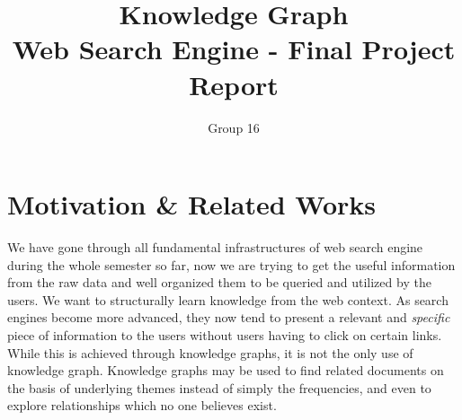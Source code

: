 \documentclass[11pt,twocolumn]{article}
\begin{document}
\baselineskip 16pt
 \newcommand{\la}{\lambda}
 \newcommand{\si}{\sigma}
 \newcommand{\ol}{1-\lambda}
 \newcommand{\be}{\begin{equation}}
 \newcommand{\ee}{\end{equation}}
 \newcommand{\bea}{\begin{eqnarray}}
 \newcommand{\eea}{\end{eqnarray}}

\setlength{\columnsep}{0.8cm}

 \newcommand{\secHead}[1]{{\bf \underline{#1}}\\}

 \newcommand{\mySection}[2]{

\begin{tabular}{l l}
\begin{minipage}[t]{1in}
\sc{#1 }
\end{minipage}

\begin{minipage}[t]{5in}
#2\\
\end{minipage}
\end{tabular}\\\\
}
\singlespacing


\title{Knowledge Graph \\ Web Search Engine - Final Project Report}
\author{Group 16}
\maketitle


\section{Motivation \& Related Works}
We have gone through all fundamental infrastructures of web search engine during the whole semester so far, now we are trying to get the useful information from the raw data and well organized them to be queried and utilized by the users. We want to structurally learn knowledge from the web context. As search engines become more advanced, they now tend to present a relevant and \emph{specific} piece of information to the users without users having to click on certain links. While this is achieved through knowledge graphs, it is not the only use of knowledge graph. Knowledge graphs may be used to find related documents on the basis of underlying themes instead of simply the frequencies, and even to explore relationships which no one believes exist.\\
\end{document}
